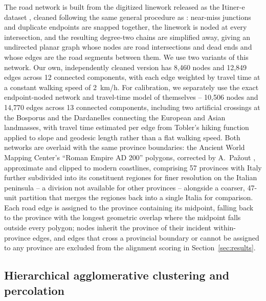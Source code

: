 \documentclass[11pt,a4paper]{article}
\begin{document}
The road network is built from the digitized linework released as the
Itiner-e dataset \citep{desoto2025itinere}, cleaned following the same
general procedure as \citet{pazout2026network}: near-miss junctions and
duplicate endpoints are snapped together, the linework is noded at every
intersection, and the resulting degree-two chains are simplified away,
giving an undirected planar graph whose nodes are road intersections and
dead ends and whose edges are the road segments between them. We use two
variants of this network. Our own, independently cleaned version has
8{,}460 nodes and 12{,}849 edges across 12 connected components, with
each edge weighted by travel time at a constant walking speed of
2~km/h. For calibration, we separately use the exact endpoint-noded
network and travel-time model of \citet{pazout2026network} themselves --
10{,}506 nodes and 14{,}770 edges across 13 connected components,
including two artificial crossings at the Bosporus and the Dardanelles
connecting the European and Asian landmasses, with travel time estimated
per edge from Tobler's hiking function \citep{tobler1993hiking} applied
to slope and geodesic length rather than a flat walking speed. Both
networks are overlaid with the same province boundaries: the Ancient
World Mapping Center's ``Roman Empire AD 200'' polygons, corrected by
A.\ Pa\v{z}out \citep{awmc2023provinces}, approximate and clipped to
modern coastlines, comprising 57 provinces with Italy further subdivided
into its constituent regiones for finer resolution on the Italian
peninsula -- a division not available for other provinces -- alongside a
coarser, 47-unit partition that merges the regiones back into a single
Italia for comparison. Each road edge is assigned to the province
containing its midpoint, falling back to the province with the longest
geometric overlap where the midpoint falls outside every polygon; nodes
inherit the province of their incident within-province edges, and edges
that cross a provincial boundary or cannot be assigned to any province
are excluded from the alignment scoring in Section~\ref{sec:results}.

\subsection{Hierarchical agglomerative clustering and percolation}
\label{sec:hac-method}
\end{document}
